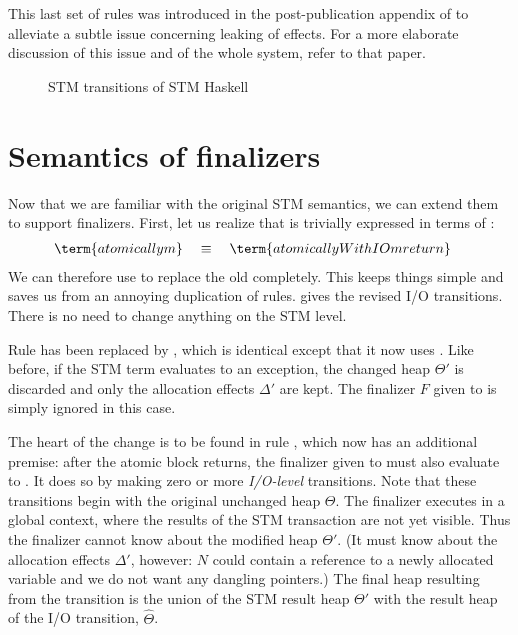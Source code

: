 This last set of rules was introduced in the post-publication appendix of \textcite{harris-et-al-2005} to alleviate a subtle issue concerning leaking of effects.
For a more elaborate discussion of this issue and of the whole system, refer to that paper.

\begin{figure}[p]

\caption{STM transitions of STM Haskell \parencite{harris-et-al-2005}}
\label{fig:orig-stm}
\end{figure}

\clearpage


\section{Semantics of finalizers}
\label{sec:stm-fin-semantics}

Now that we are familiar with the original STM semantics, we can extend them to support finalizers.
First, let us realize that  is trivially expressed in terms of :
\begin{align*}
\term{atomically m} & \quad\equiv\quad \term{atomicallyWithIO m return}
\end{align*}
We can therefore use  to replace the old  completely.
This keeps things simple and saves us from an annoying duplication of rules.
 gives the revised I/O transitions.
There is no need to change anything on the STM level.

Rule  has been replaced by , which is identical except that it now uses .
Like before, if the STM term evaluates to an exception, the changed heap $\Theta'$ is discarded and only the allocation effects $\Delta'$ are kept.
The finalizer $F$ given to  is simply ignored in this case.

The heart of the change is to be found in rule , which now has an additional premise:
after the atomic block returns, the finalizer given to  must also evaluate to .
It does so by making zero or more \emph{I/O-level} transitions.
Note that these transitions begin with the original unchanged heap $\Theta$.
The finalizer executes in a global context, where the results of the STM transaction are not yet visible.
Thus the finalizer cannot know about the modified heap $\Theta'$.
(It must know about the allocation effects $\Delta'$, however:
$N$ could contain a reference to a newly allocated variable and we do not want any dangling pointers.)
The final heap resulting from the  transition is the union of the STM result heap $\Theta'$ with the result heap of the I/O transition, $\hat{\Theta}$.

